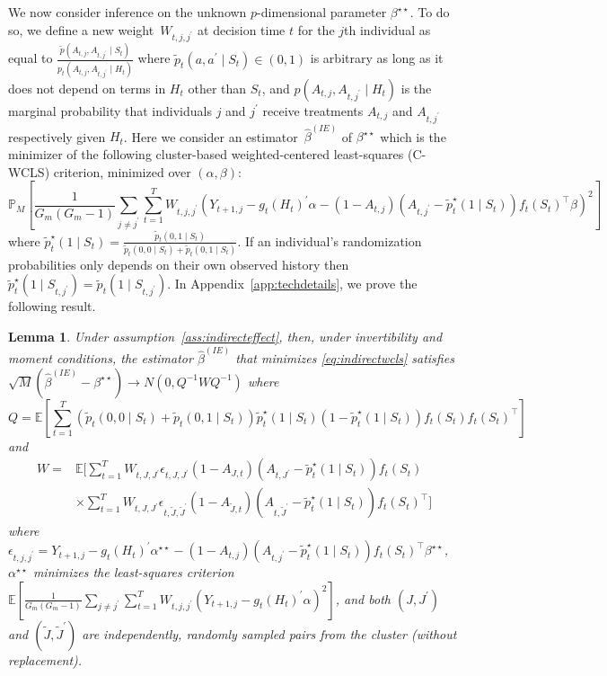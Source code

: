 \documentclass[12pt]{article}
\newtheorem{lemma}[thm]{Lemma}
\begin{document}
We now consider inference on the unknown $p$-dimensional parameter $\beta^{\star \star}$. To do so, we define a new weight~$W_{t,j, j^\prime}$ at decision time $t$ for the $j$th individual as equal to $\frac{\tilde p (A_{t,j}, A_{t,j^\prime} \mid S_t)}{p_t (A_{t,j}, A_{t,j^\prime} \mid H_t)}$ where $\tilde p_t (a, a^\prime \mid S_t)\in (0,1)$ is arbitrary as long as it does not depend on terms in $H_t$ other than $S_t$, and $p(A_{t,j}, A_{t,j^\prime} \mid H_t)$ is the marginal probability that individuals $j$ and $j^\prime$ receive treatments $A_{t,j}$ and $A_{t,j^\prime}$ respectively given $H_t$.  Here we consider an estimator~$\hat \beta^{(IE)}$ of $\beta^{\star \star}$ which is the minimizer of the following cluster-based weighted-centered least-squares (C-WCLS) criterion, minimized over $(\alpha, \beta)$:
\begin{equation}
\label{eq:indirectwcls}
\mathbb{P}_M \left[ \frac{1}{G_m (G_m-1)} \sum_{j \neq j^\prime} \sum_{t=1}^T W_{t,j, j^\prime} \left(Y_{t+1,j} - g_t (H_t)^\prime \alpha - (1-A_{t,j}) (A_{t,j^\prime} - \tilde p_t^\star (1\mid S_t)) f_t(S_t)^\top \beta \right)^2 \right]
\end{equation}
where $\tilde p_t^\star (1\mid S_t) = \frac{\tilde p_t (0,1 \mid S_t)}{\tilde p_t (0,0 \mid S_t) + \tilde p_t (0,1 \mid S_t)}$.  If an individual's randomization probabilities only depends on their own observed history then $\tilde p_t^\star (1 \mid S_{t,j^\prime}) = \tilde p_t (1 \mid S_{t,j^\prime})$.  In Appendix~\ref{app:techdetails}, we prove the following result.

\begin{lemma}
\label{lemma:asymnorm2}
Under assumption~\ref{ass:indirecteffect}, then, under invertibility and moment conditions, the estimator $\hat \beta^{(IE)}$ that minimizes \eqref{eq:indirectwcls} satisfies $\sqrt{M} \left( \hat \beta^{(IE)} - \beta^{\star \star} \right) \to N(0, Q^{-1} W Q^{-1})$ where
$$
Q = \mathbb{E} \left[ \sum_{t=1}^T (\tilde p_t (0,0 \mid S_t) + \tilde p_t (0,1 \mid S_t)) \tilde p_t^\star ( 1 \mid S_{t} ) ( 1- \tilde p_t^\star ( 1 \mid S_{t} )) f_t (S_t) f_t (S_t)^\top \right]
$$
and
\begin{align*}
W =  &\mathbb{E} \bigg[ \sum_{t=1}^T W_{t,J,J^\prime} \epsilon_{t,J,J^\prime} (1-A_{J,t})( A_{t,J^\prime} - \tilde p_t^\star( 1 \mid S_{t} )) f_t (S_t) \\
&\times \sum_{t=1}^T W_{t,J,J^\prime} \epsilon_{t, \tilde J, \tilde J^\prime} (1-A_{\tilde J,t}) ( A_{t,\tilde J^\prime} - \tilde p_t^\star( 1 \mid S_{t} )) f_t (S_t)^\top  \bigg]
\end{align*}
where $\epsilon_{t,j,j^\prime} = Y_{t+1,j} - g_t(H_t)^\prime \alpha^{\star \star} - (1-A_{t,j}) (A_{t,j^\prime} - \tilde p_t^\star (1 \mid S_t) ) f_t (S_t)^\top \beta^{\star \star}$, $\alpha^{\star \star}$ minimizes the least-squares criterion $\mathbb{E}  \left[ \frac{1}{G_m (G_m-1)} \sum_{j \neq j^\prime} \sum_{t=1}^T W_{t,j,j^\prime} \left( Y_{t+1,j} - g_t(H_t)^\prime \alpha \right)^2 \right]$, and both $(J,J^\prime)$ and $(\tilde J, \tilde J^\prime)$ are independently, randomly sampled pairs from the cluster (without replacement).
\end{lemma}
\end{document}

